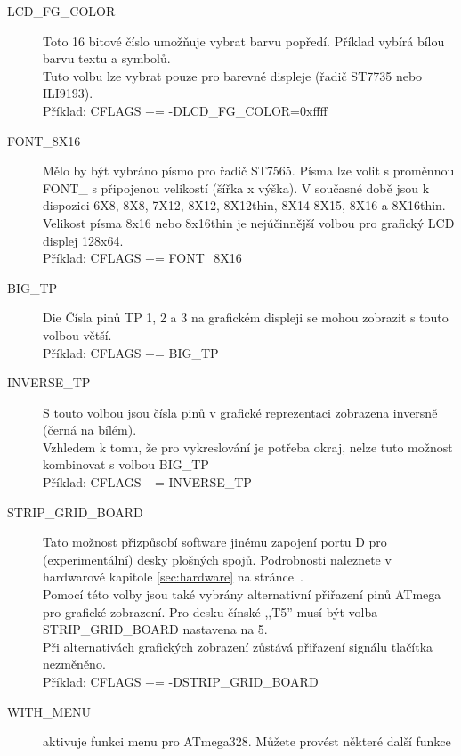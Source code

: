 \begin{description}
\vspace{-0,3cm}
 \item[LCD\_FG\_COLOR] Toto 16 bitové číslo umožňuje vybrat barvu popředí.
Příklad vybírá bílou barvu textu a symbolů.\\
Tuto volbu lze vybrat pouze pro barevné displeje (řadič ST7735 nebo ILI9193).\\
Příklad: CFLAGS += -DLCD\_FG\_COLOR=0xffff
\vspace{-0,3cm}
  \item[FONT\_8X16] Mělo by být vybráno písmo pro řadič ST7565.
Písma lze volit s proměnnou FONT\_ s připojenou velikostí (šířka x výška).
V současné době jsou k dispozici 6X8, 8X8, 7X12, 8X12, 8X12thin, 8X14 8X15, 8X16 a 8X16thin.\\
Velikost písma 8x16 nebo 8x16thin je nejúčinnější volbou pro grafický LCD displej 128x64.\\
Příklad: CFLAGS += FONT\_8X16
\vspace{-0,3cm}
 \item[BIG\_TP] Die Čísla pinů TP 1, 2 a 3 na grafickém displeji se mohou zobrazit s touto volbou větší.\\
Příklad: CFLAGS += BIG\_TP
\vspace{-0,3cm}
 \item[INVERSE\_TP] S touto volbou jsou čísla pinů v grafické reprezentaci zobrazena inversně\\ (černá na bílém).\\
Vzhledem k tomu, že pro vykreslování je potřeba okraj, nelze tuto možnost kombinovat s volbou BIG\_TP\\
Příklad: CFLAGS += INVERSE\_TP
\vspace{-0,3cm}
  \item[STRIP\_GRID\_BOARD] Tato možnost přizpůsobí software jinému zapojení portu D pro (experimentální) desky plošných spojů.
Podrobnosti naleznete v hardwarové kapitole \ref{sec:hardware} na stránce~\pageref{sec:hardware}.\\
Pomocí této volby jsou také vybrány alternativní přiřazení pinů ATmega pro grafické zobrazení.
Pro desku čínské ,,T5'' musí být volba  STRIP\_GRID\_BOARD nastavena na 5.\\
Při alternativách grafických zobrazení zůstává přiřazení signálu tlačítka nezměněno.\\
Příklad: CFLAGS += -DSTRIP\_GRID\_BOARD
\vspace{-0,3cm}
  \item[WITH\_MENU] aktivuje funkci menu pro ATmega328. Můžete provést některé další funkce 

\end{description}
